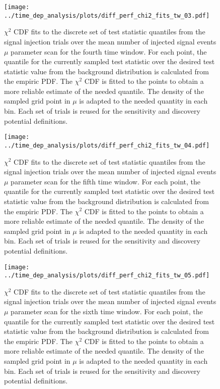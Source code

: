 \begin{figure}[H]
  \centering
  \texttt{[image: ../time\_dep\_analysis/plots/diff\_perf\_chi2\_fits\_tw\_03.pdf]}
  \caption[$\chi^2$ CDF fits for the 4th time window differential performance]{
     $\chi^2$ CDF fits to the discrete set of test statistic quantiles from the signal injection trials over the mean number of injected signal events $\mu$ parameter scan for the fourth time window.
     For each point, the quantile for the currently sampled test statistic over the desired test statistic value from the background distribution is calculated from the empiric PDF.
     The $\chi^2$ CDF is fitted to the points to obtain a more reliable estimate of the needed quantile.
     The density of the sampled grid point in $\mu$ is adapted to the needed quantity in each bin.
     Each set of trials is reused for the sensitivity and discovery potential definitions.
  }
  \label{fig:diff_perf_chi2_fits_tw_03}
\end{figure}
\begin{figure}[H]
  \centering
  \texttt{[image: ../time\_dep\_analysis/plots/diff\_perf\_chi2\_fits\_tw\_04.pdf]}
  \caption[$\chi^2$ CDF fits for the 5th time window differential performance]{
     $\chi^2$ CDF fits to the discrete set of test statistic quantiles from the signal injection trials over the mean number of injected signal events $\mu$ parameter scan for the fifth time window.
     For each point, the quantile for the currently sampled test statistic over the desired test statistic value from the background distribution is calculated from the empiric PDF.
     The $\chi^2$ CDF is fitted to the points to obtain a more reliable estimate of the needed quantile.
     The density of the sampled grid point in $\mu$ is adapted to the needed quantity in each bin.
     Each set of trials is reused for the sensitivity and discovery potential definitions.
  }
  \label{fig:diff_perf_chi2_fits_tw_04}
\end{figure}
\begin{figure}[H]
  \centering
  \texttt{[image: ../time\_dep\_analysis/plots/diff\_perf\_chi2\_fits\_tw\_05.pdf]}
  \caption[$\chi^2$ CDF fits for the 6th time window differential performance]{
     $\chi^2$ CDF fits to the discrete set of test statistic quantiles from the signal injection trials over the mean number of injected signal events $\mu$ parameter scan for the sixth time window.
     For each point, the quantile for the currently sampled test statistic over the desired test statistic value from the background distribution is calculated from the empiric PDF.
     The $\chi^2$ CDF is fitted to the points to obtain a more reliable estimate of the needed quantile.
     The density of the sampled grid point in $\mu$ is adapted to the needed quantity in each bin.
     Each set of trials is reused for the sensitivity and discovery potential definitions.
  }
  \label{fig:diff_perf_chi2_fits_tw_05}
\end{figure}
